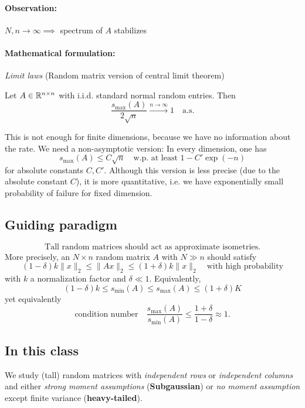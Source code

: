 \paragraph{Observation:} $N,n \to \infty \implies $ spectrum of $A$ stabilizes 
\paragraph{Mathematical formulation:} \emph{Limit laws} (Random matrix version of central limit theorem)
\begin{example*}
Let $A\in \mathbb{R}^{n\times n}$ with i.i.d. standard normal random entries. Then
\begin{equation*}
\frac{s_{\max}(A)}{2\sqrt{n}} \overset{n\to\infty}{\longrightarrow} 1 \quad \text{a.s.}
\end{equation*}
\end{example*}
This is not enough for finite dimensions, because we have no information about the rate. We need a non-asymptotic version: In every dimension, one has
\begin{equation*}
s_{\max} (A) \leq C\sqrt{n} \quad \text{w.p. at least } 1-C'\exp(-n)
\end{equation*}
for absolute constants $C,C'$. Although this version is less precise (due to the absolute constant $C$),  it is more quantitative, i.e. we have exponentially small probability of failure for fixed dimension.
\subsection{Guiding paradigm}
$$
\boxed{\text{Tall random matrices should act as approximate isometries.}}
$$
More precisely, an $N\times n$ random matrix $A$ with $N\gg n$ should satisfy
\begin{equation*}
(1-\delta) k\|x\|_2 \leq \|Ax\|_2 \leq (1+\delta) k\|x\|_2 \quad \text{with high probability}
\end{equation*}
with $k$ a normalization factor and $\delta \ll 1$. Equivalently,
\begin{equation*}
(1-\delta) k \leq s_{\min}(A) \leq s_{\max}(A) \leq (1+\delta)K
\end{equation*}
yet equivalently
\begin{equation*}
\text{condition number} \quad \frac{s_{\max}(A)}{s_{\min}(A)} \leq \frac{1+\delta}{1-\delta}\approx 1.
\end{equation*}
\subsection{In this class}
We study (tall) random matrices with \emph{independent rows} or \emph{independent columns} and either \emph{strong moment assumptions} (\textbf{Subgaussian}) or \emph{no moment assumption} except finite variance (\textbf{heavy-tailed}). 
